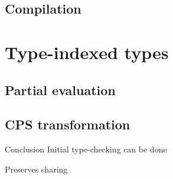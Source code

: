 \documentclass[ucs]{beamer}
\begin{document}
\subsection{Compilation}
\section{Type-indexed types}
\subsection{Partial evaluation}
\subsection{CPS transformation}

\begin{frame}{Conclusion}
    Initial type-checking can be done

    Preserves sharing
\end{frame}
\end{document}
